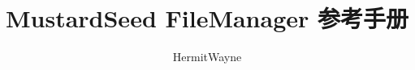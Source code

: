 \documentclass[a4paper]{article}
\begin{document}
\begin{CJK*}{UTF8}{song}

\title{MustardSeed FileManager 参考手册}
\author{HermitWayne}
\date{}
\maketitle




\end{CJK*}
\end{document}
